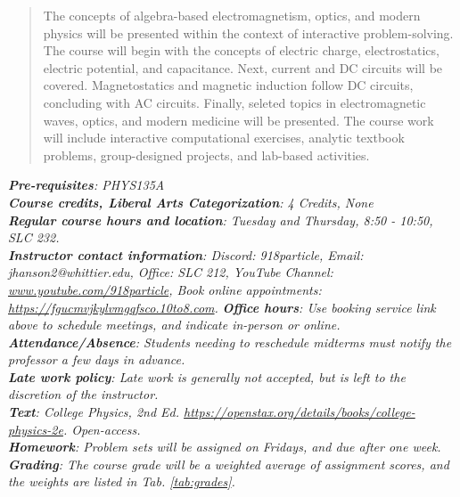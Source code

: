 \documentclass[10pt]{article}
\begin{document}
\maketitle

\begin{abstract}
The concepts of algebra-based electromagnetism, optics, and modern physics will be presented within the context of interactive problem-solving.  The course will begin with the concepts of electric charge, electrostatics, electric potential, and capacitance.  Next, current and DC circuits will be covered.  Magnetostatics and magnetic induction follow DC circuits, concluding with AC circuits.  Finally, seleted topics in electromagnetic waves, optics, and modern medicine will be presented.  The course work will include interactive computational exercises, analytic textbook problems, group-designed projects, and lab-based activities.
\end{abstract}
\noindent
\textit{\textbf{Pre-requisites}: PHYS135A} \\
\textit{\textbf{Course credits, Liberal Arts Categorization}: 4 Credits, None} \\
\textit{\textbf{Regular course hours and location}: Tuesday and Thursday, 8:50 - 10:50, SLC 232.} \\
\textit{\textbf{Instructor contact information}: Discord: 918particle, Email: jhanson2@whittier.edu, Office: SLC 212, YouTube Channel: \url{www.youtube.com/918particle}, Book online appointments: \url{https://fgucmvjkylvmgqfsco.10to8.com}.}
\noindent
\textit{\textbf{Office hours}: Use booking service link above to schedule meetings, and indicate in-person or online.} \\
\textit{\textbf{Attendance/Absence}: Students needing to reschedule midterms must notify the professor a few days in advance.} \\ 
\textit{\textbf{Late work policy}: Late work is generally not accepted, but is left to the discretion of the instructor.} \\
\textit{\textbf{Text}: College Physics, 2nd Ed. \url{https://openstax.org/details/books/college-physics-2e}. Open-access.} \\
\textit{\textbf{Homework}: Problem sets will be assigned on Fridays, and due after one week.} \\
\textit{\textbf{Grading}: The course grade will be a weighted average of assignment scores, and the weights are listed in Tab. \ref{tab:grades}.}
\end{document}
